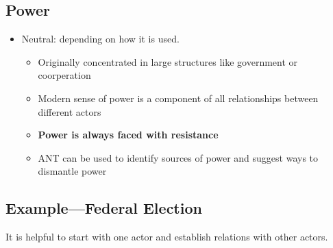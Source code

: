 \documentclass[a4paper]{article}
\numberwithin{equation}{section}
\begin{document}
\subsection{Power}
\begin{itemize}
    \item Neutral: depending on how it is used.
    \begin{itemize}
        \item Originally concentrated in large structures like government or coorperation
        \item Modern sense of power is a component of all relationships between different actors
        \item \textbf{Power is always faced with resistance}
        \item ANT can be used to identify sources of power and suggest ways to dismantle power   
    \end{itemize}
\end{itemize}

\subsection{Example---Federal Election}

It is helpful to start with one actor and establish relations with other actors. 
\end{document}
